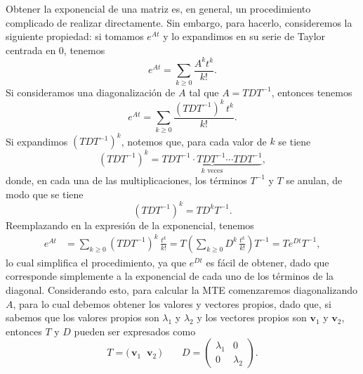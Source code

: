 \documentclass[
  11pt,
  letterpaper,
   addpoints,
   answers
  ]{exam}
\begin{document}
\begin{questions}
\begin{solution}
Obtener la exponencial de una matriz es, en general, un procedimiento complicado de realizar directamente. Sin embargo, para hacerlo, consideremos la siguiente propiedad: si tomamos $e^{At}$
y lo expandimos en su serie de Taylor centrada en 0, tenemos
\begin{equation}
e^{At}=\sum_{k\ge 0}\frac{A^k t^k}{k!}.
\end{equation}
Si consideramos una diagonalización de $A$ tal que $A=TDT^{-1}$, entonces tenemos
\begin{equation}
e^{At}=\sum_{k\ge 0}\frac{(TDT^{-1})^{k}\,t^k}{k!}.
\end{equation}
Si expandimos $(TDT^{-1})^{k}$, notemos que, para cada valor de $k$ se tiene
\begin{equation}
(TDT^{-1})^{k}=
\underbrace{TDT^{-1}\cdot TDT^{-1}\cdots TDT^{-1}}_{\text{$k$ veces}},
\end{equation}
donde, en cada una de las multiplicaciones, los términos $T^{-1}$ y $T$ se anulan, de modo que se tiene
\begin{equation}
(TDT^{-1})^{k}=TD^{k}T^{-1}.
\end{equation}
Reemplazando en la expresión de la exponencial, tenemos
\begin{equation}
\begin{aligned}
e^{At}&=\sum_{k\ge 0}(TDT^{-1})^{k}\,\frac{t^k}{k!}
= T\left(\sum_{k\ge 0}D^{k}\,\frac{t^k}{k!}\right)T^{-1}
=Te^{Dt}T^{-1},
\end{aligned}
\end{equation}
lo cual simplifica el procedimiento, ya que $e^{Dt}$ es fácil de obtener, dado que corresponde simplemente
a la exponencial de cada uno de los términos de la diagonal. Considerando esto, para calcular la MTE comenzaremos diagonalizando $A$, para lo cual debemos
obtener los valores y vectores propios, dado que, si sabemos que los valores propios son $\lambda_1$ y $\lambda_2$ y los
vectores propios son $\mathbf{v}_1$ y $\mathbf{v}_2$, entonces $T$ y $D$ pueden ser expresados como
\begin{equation}
T=\big(\,\mathbf{v}_1\;\;\mathbf{v}_2\,\big)
\qquad
D=\begin{pmatrix}
\lambda_1 & 0\\
0 & \lambda_2
\end{pmatrix}.
\end{equation}


\end{solution}
\end{questions}
\end{document}
